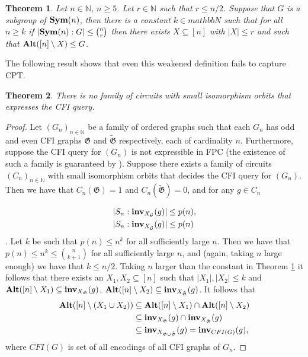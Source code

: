 \documentclass[12pt]{report}
\newtheorem{thm}{Theorem} \newtheorem{claim}{Claim}
\newcommand{\inv}{\text{\textbf{inv}}}
\newcommand{\alt}{\text{\textbf{Alt}}}
\newcommand{\sym}{\text{\textbf{Sym}}}
\begin{document}
\begin{thm}
  \label{thm:simple_group}
  Let $n \in \mathbb{N}$, $n \geq 5$. Let $r \in \mathbb{N}$ such that
  $r \leq n/2$. Suppose that $G$ is a subgroup of $\sym(n)$, then
  there is a constant $k \in mathbb{N}$ such that for all $n \geq k$
  if $\vert \sym(n):G \vert \leq {{n}\choose {r}}$ then there exists
  $X \subseteq [n]$ with $\vert X \vert \leq r$ and such that
  $\alt([n] \setminus X) \leq G$.
\end{thm}

The following result shows that even this weakened definition fails to
capture CPT.
\begin{thm}
  There is no family of circuits with small isomorphism orbits that
  expresses the CFI query.
\end{thm}
\begin{proof}
  Let $(G_n)_{n \in \mathbb{N}}$ be a family of ordered graphs such that each $G_n$ has
  odd and even CFI graphs $\mathfrak{G}$ and $\tilde{\mathfrak{G}}$ respectively, each of
  cardinality $n$. Furthermore, suppose the CFI query for $(G_n)$ is not expressible in
  FPC (the existence of such a family is guaranteed by
  \cite{}). Suppose there exists a family of circuits $(C_n)_{n \in \mathbb{N}}$ with
  small isomorphism orbits that decides the CFI query for $(G_n)$.
  Then we have that $C_n(\mathfrak{G}) = 1$ and
  $C_n(\tilde{\mathfrak{G}}) = 0$, and for any $g \in C_n$

  \begin{align*}
    \vert S_n : \inv_{X_{\mathcal{G}}}(g) \vert &\leq p(n),\\
    \vert S_n : \inv_{X_{\tilde{\mathcal{G}}}}(g) \vert &\leq p(n)
  \end{align*}.
  Let $k$ be such that $p(n) \leq n^k$ for all sufficiently large $n$. Then we have that $p(n) \leq n^k \leq {{n}\choose{k+1}}$ for all sufficiently large $n$, and (again, taking $n$ large enough) we have that $k \leq n/2$. Taking $n$ larger than the constant in Theorem \ref{thm:simple_group} it follows that there exists an $X_1, X_2 \subseteq [n]$ such that $\vert X_1 \vert, \vert X_2 \vert \leq k$ and $\alt ([n] \setminus X_1) \subseteq  \inv_{X_{\mathfrak{G}}}(g)$, $\alt ([n] \setminus X_2) \subseteq  \inv_{X_{\tilde{\mathfrak{G}}}}(g)$. It follows that
  \begin{align*}
    \alt ([n] \setminus (X_1 \cup X_2)) &\subseteq \alt ([n] \setminus X_1) \cap \alt ([n] \setminus X_2)\\
                                        &\subseteq \inv_{X_{\mathfrak{G}}}(g) \cap \inv_{X_{\tilde{\mathfrak{G}}}}(g) \\
                                        &\subseteq \inv_{X_{\mathfrak{G} \cup \tilde{\mathfrak{G}}}}(g) =  \inv_{CFI(G)}(g),
  \end{align*}
  where $CFI(G)$ is set of all encodings of all CFI graphs of $G_n$.


\end{proof}
\end{document}
